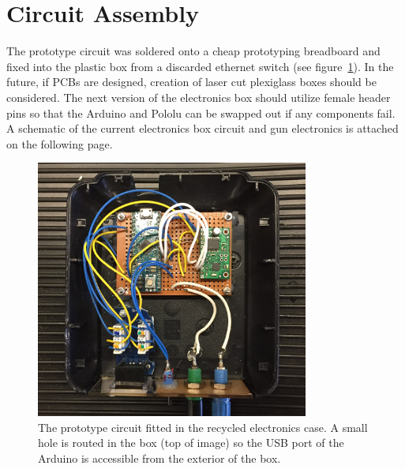 \documentclass[letterpaper,12pt]{article}
\begin{document}
\section{Circuit Assembly}
The prototype circuit was soldered onto a cheap prototyping breadboard and fixed into the plastic box from a discarded ethernet switch (see figure~\ref{fig:box_innards}). In the future, if PCBs are designed, creation of laser cut plexiglass boxes should be considered. The next version of the electronics box should utilize female header pins so that the Arduino and Pololu can be swapped out if any components fail. A schematic of the current electronics box circuit and gun electronics is attached on the following page.
\begin{figure} [h!]
		\centering
		\includegraphics[width=0.8\textwidth]{electronics.JPG}
		\caption{The prototype circuit fitted in the recycled electronics case. A small hole is routed in the box (top of image) so the USB port of the Arduino is accessible from the exterior of the box.}
		\label{fig:box_innards}
\end{figure}

\end{document}
